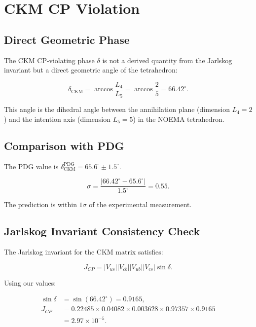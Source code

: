 \chapter{CKM CP Violation}
\label{ch:ckm_cp_violation}

\section{Direct Geometric Phase}

The CKM CP-violating phase \(\delta\) is not a derived quantity from the
Jarlskog invariant but a direct geometric angle of the tetrahedron:

\begin{equation}
\delta_{\text{CKM}} = \arccos\frac{L_4}{L_5}
                    = \arccos\frac{2}{5}
                    = 66.42^\circ.
\label{eq:ckm_delta}
\end{equation}

This angle is the dihedral angle between the annihilation plane
(dimension \(L_4 = 2\)) and the intention axis (dimension \(L_5 = 5\))
in the NOEMA tetrahedron.

\section{Comparison with PDG}

The PDG value is \(\delta_{\text{CKM}}^{\text{PDG}} = 65.6^\circ \pm 1.5^\circ\).

\[
\sigma = \frac{|66.42^\circ - 65.6^\circ|}{1.5^\circ} = 0.55.
\]

The prediction is within \(1\sigma\) of the experimental measurement.

\section{Jarlskog Invariant Consistency Check}

The Jarlskog invariant for the CKM matrix satisfies:

\[
J_{CP} = |V_{us}||V_{cb}||V_{ub}||V_{cs}|\sin\delta.
\]

Using our values:

\[
\begin{aligned}
\sin\delta &= \sin(66.42^\circ) = 0.9165, \\
J_{CP} &= 0.22485 \times 0.04082 \times 0.003628
          \times 0.97357 \times 0.9165 \\
       &= 2.97 \times 10^{-5}.
\end{aligned}
\]

